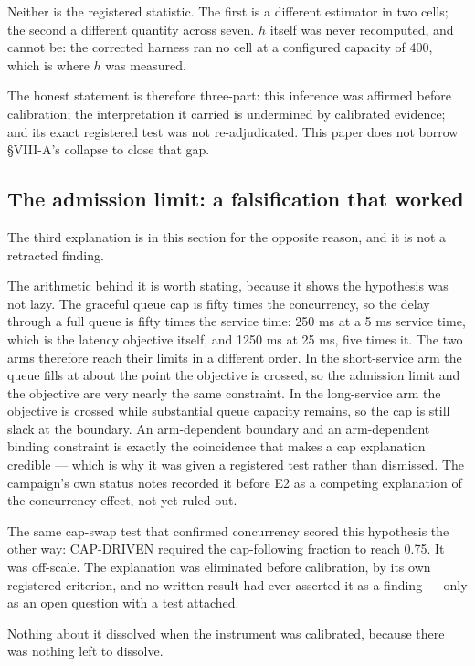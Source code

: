 \documentclass{ieeeaccess}
\begin{document}
Neither is the registered statistic. The first is a different estimator in two cells; the second a different quantity across seven. $h$ itself was never recomputed, and cannot be: the corrected harness ran no cell at a configured capacity of 400, which is where $h$ was measured.

The honest statement is therefore three-part: this inference was affirmed before calibration; the interpretation it carried is undermined by calibrated evidence; and its exact registered test was not re-adjudicated. This paper does not borrow \S{}VIII-A's collapse to close that gap.

\subsection{The admission limit: a falsification that worked}

The third explanation is in this section for the opposite reason, and it is not a retracted finding.

The arithmetic behind it is worth stating, because it shows the hypothesis was not lazy. The graceful queue cap is fifty times the concurrency, so the delay through a full queue is fifty times the service time: 250 ms at a 5 ms service time, which is the latency objective itself, and 1250 ms at 25 ms, five times it. The two arms therefore reach their limits in a different order. In the short-service arm the queue fills at about the point the objective is crossed, so the admission limit and the objective are very nearly the same constraint. In the long-service arm the objective is crossed while substantial queue capacity remains, so the cap is still slack at the boundary. An arm-dependent boundary and an arm-dependent binding constraint is exactly the coincidence that makes a cap explanation credible --- which is why it was given a registered test rather than dismissed. The campaign's own status notes recorded it before E2 as a competing explanation of the concurrency effect, not yet ruled out.

The same cap-swap test that confirmed concurrency scored this hypothesis the other way: CAP-DRIVEN required the cap-following fraction to reach 0.75. It was off-scale. The explanation was eliminated before calibration, by its own registered criterion, and no written result had ever asserted it as a finding --- only as an open question with a test attached.

Nothing about it dissolved when the instrument was calibrated, because there was nothing left to dissolve.
\end{document}
